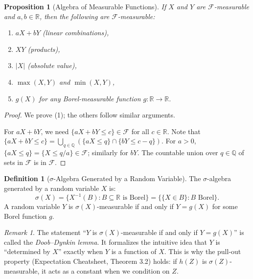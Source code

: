 \documentclass[11pt,a4paper]{article}
\theoremstyle{definition}
\newtheorem{definition}{Definition}[section]
\theoremstyle{plain}
\newtheorem{proposition}[theorem]{Proposition}
\theoremstyle{remark}
\newtheorem{remark}{Remark}[section]
\newcommand{\R}{\mathbb{R}}
\begin{document}
\begin{proposition}[Algebra of Measurable Functions]
\label{prop:measurable_algebra}
If $X$ and $Y$ are $\mathcal{F}$-measurable and $a, b \in \R$, then the following are $\mathcal{F}$-measurable:
\begin{enumerate}[nosep]
    \item $aX + bY$ (linear combinations),
    \item $XY$ (products),
    \item $|X|$ (absolute value),
    \item $\max(X, Y)$ and $\min(X, Y)$,
    \item $g(X)$ for any Borel-measurable function $g: \R \to \R$.
\end{enumerate}
\end{proposition}

\begin{proof}
We prove (1); the others follow similar arguments.

For $aX + bY$, we need $\{aX + bY \leq c\} \in \mathcal{F}$ for all $c \in \R$. Note that $\{aX + bY \leq c\} = \bigcup_{q \in \mathbb{Q}} (\{aX \leq q\} \cap \{bY \leq c - q\})$. For $a > 0$, $\{aX \leq q\} = \{X \leq q/a\} \in \mathcal{F}$; similarly for $bY$. The countable union over $q \in \mathbb{Q}$ of sets in $\mathcal{F}$ is in $\mathcal{F}$.
\end{proof}

\begin{definition}[$\sigma$-Algebra Generated by a Random Variable]
\label{def:sigma_rv}
The $\sigma$-algebra generated by a random variable $X$ is:
\begin{equation}
    \sigma(X) = \{X^{-1}(B) : B \subseteq \R \text{ is Borel}\} = \{\{X \in B\} : B \text{ Borel}\}.
    \label{eq:sigma_rv}
\end{equation}
A random variable $Y$ is $\sigma(X)$-measurable if and only if $Y = g(X)$ for some Borel function $g$.
\end{definition}

\begin{remark}
The statement ``$Y$ is $\sigma(X)$-measurable if and only if $Y = g(X)$'' is called the \emph{Doob--Dynkin lemma}. It formalizes the intuitive idea that $Y$ is ``determined by $X$'' exactly when $Y$ is a function of $X$. This is why the pull-out property (Expectation Cheatsheet, Theorem 3.2) holds: if $h(Z)$ is $\sigma(Z)$-measurable, it acts as a constant when we condition on $Z$.
\end{remark}
\end{document}
